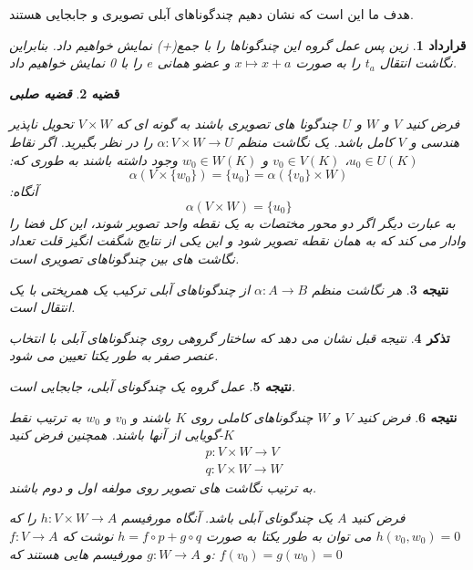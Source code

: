 \documentclass[12pt]{report}
\newtheorem{thm}{قضیه}[chapter]
\newtheorem{cor}[thm]{نتیجه}
\newtheorem{rem}[thm]{تذکر}
\newtheorem{ghr}[thm]{قرارداد}
\begin{document}
	 هدف ما این است که نشان دهیم چندگوناهای آبلی تصویری و جابجایی هستند. 
	 \begin{ghr}
	 	زین پس عمل گروه این چندگوناها را با جمع(+) نمایش خواهیم داد.
	 	بنابراین نگاشت انتقال 
	 	$t_a$
	 	را به صورت 
	 	$x\mapsto x+a$ 
	 	و عضو همانی 
	 	$e$
	 	را با 0 نمایش خواهیم داد.
	 \end{ghr}
	  
	  \begin{thm}
	  	\textbf{\large قضیه صلبی}
	  	
	  	فرض کنید 
	  	$V$ و $W$ و $U$
	  	چندگونا های تصویری باشند به گونه ای که
	  	$V\times W$
	  	تحویل ناپذیر هندسی
	  	و 
	  	$V$
	  	کامل باشد. یک نگاشت منظم 
	  	$\alpha:V\times W \rightarrow U$
	  	را در نظر بگیرید. اگر نقاط 
	  	$u_0\in U(K)$، $v_0\in V(K)$ و $w_0\in W(K)$
	  	وجود داشته باشند به طوری که:
	  	$$\alpha(V\times \{w_0\}) = \{u_0\} = \alpha(\{v_0\}\times W)$$
	  	آنگاه:
	  	$$\alpha(V\times W)=\{u_0\}$$
	  	به عبارت دیگر اگر دو محور مختصات به یک نقطه واحد تصویر شوند، این کل فضا را وادار می کند که به همان نقطه تصویر شود و این یکی از نتایج شگفت انگیز قلت تعداد نگاشت های بین چندگوناهای تصویری است.
	  \end{thm}
	  \begin{cor}
	  	هر نگاشت منظم 
	  	$\alpha:A\rightarrow B$
	  	از چندگوناهای آبلی ترکیب یک همریختی با یک انتقال است.
	  \end{cor}
	  \begin{rem}
	  	نتیجه قبل نشان می دهد که ساختار گروهی روی چندگوناهای آبلی با انتخاب عنصر صفر به طور یکتا تعیین می شود.
	  \end{rem}
	  \begin{cor}
	  	عمل گروه یک چندگونای آبلی، جابجایی است. 
	  \end{cor}
	  \begin{cor}
	  	فرض کنید 
	  	$V$ و $W$
	  	چندگوناهای کاملی روی 
	  	$K$
	  	باشند و
	  	$v_0$ و $w_0$
	  	به ترتیب نقط $K$-گویایی از آنها باشند. همچنین فرض کنید 
	  	\begin{equation*}
	  		\begin{aligned}
	  			&p:V\times W \rightarrow V\\
	  			&q:V\times W \rightarrow W
	  		\end{aligned}	  		
	  	\end{equation*}
	  	به ترتیب نگاشت های تصویر روی مولفه اول و دوم باشند.
	  	
	  	فرض کنید $A$ یک چندگونای آبلی باشد. آنگاه مورفیسم 
	  	$h:V\times W\rightarrow A$
	  	را که 
	  	$h(v_0,w_0)=0$
	  	می توان به طور یکتا به صورت 
	  	$h = f \circ p + g\circ q$
	  	نوشت که 
	  	$ f:V\rightarrow A$ و $g:W\rightarrow A$
	  	مورفیسم هایی هستند که:
	  	$f(v_0) = g(w_0) = 0$
	  \end{cor}
\end{document}
